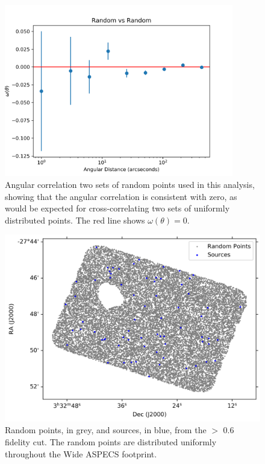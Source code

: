 \begin{figure}[!htbp]
\centering \includegraphics[width=100mm]{clustering/Random_vs_Random_2000_bin9.png}
\caption{Angular correlation two sets of random points used in this analysis, showing that the angular correlation is consistent with zero, as would be expected for cross-correlating two sets of uniformly distributed points. The red line shows $\omega(\theta) = 0$.}
\label{fig:random_points}
\end{figure}



\begin{figure}[!htbp]
\centering \includegraphics[width=120mm]{PDFS/NX_V_Y_Sources_20000.png}
\caption{Random points, in grey, and sources, in blue, from the $>$ 0.6 fidelity cut. The random points are distributed uniformly throughout the Wide ASPECS footprint.}
\label{fig:Clustering_points}
\end{figure}

